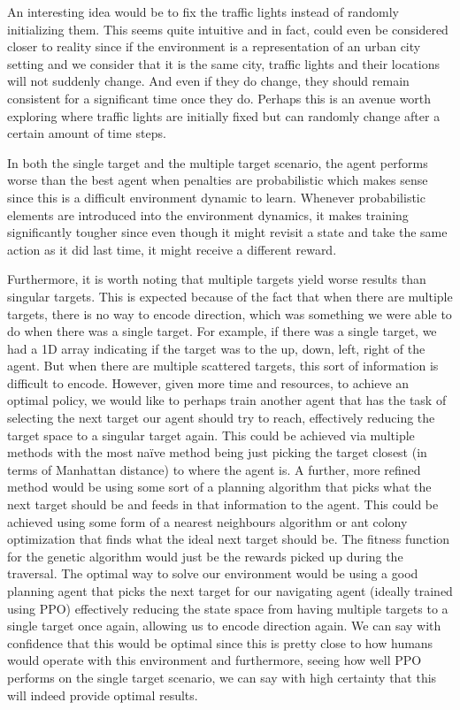 \documentclass{article}
\begin{document}
An interesting idea would be to fix the traffic lights instead of randomly initializing them. This seems quite intuitive and in fact, could even be considered closer to reality since if the environment is a representation of an urban city setting and we consider that it is the same city, traffic lights and their locations will not suddenly change. And even if they do change, they should remain consistent for a significant time once they do. Perhaps this is an avenue worth exploring where traffic lights are initially fixed but can randomly change after a certain amount of time steps. 

In both the single target and the multiple target scenario, the agent performs worse than the best agent when penalties are probabilistic which makes sense since this is a difficult environment dynamic to learn. Whenever probabilistic elements are introduced into the environment dynamics, it makes training significantly tougher since even though it might revisit a state and take the same action as it did last time, it might receive a different reward.

Furthermore, it is worth noting that multiple targets yield worse results than singular targets. This is expected because of the fact that when there are multiple targets, there is no way to encode direction, which was something we were able to do when there was a single target. For example, if there was a single target, we had a 1D array indicating if the target was to the up, down, left, right of the agent. But when there are multiple scattered targets, this sort of information is difficult to encode. However, given more time and resources, to achieve an optimal policy, we would like to perhaps train another agent that has the task of selecting the next target our agent should try to reach, effectively reducing the target space to a singular target again. This could be achieved via multiple methods with the most na\"ive method being just picking the target closest (in terms of Manhattan distance) to where the agent is. A further, more refined method would be using some sort of a planning algorithm that picks what the next target should be and feeds in that information to the agent. This could be achieved using some form of a nearest neighbours algorithm or ant colony optimization that finds what the ideal next target should be. The fitness function for the genetic algorithm would just be the rewards picked up during the traversal. The optimal way to solve our environment would be using a good planning agent that picks the next target for our navigating agent (ideally trained using PPO) effectively reducing the state space from having multiple targets to a single target once again, allowing us to encode direction again. We can say with confidence that this would be optimal since this is pretty close to how humans would operate with this environment and furthermore, seeing how well PPO performs on the single target scenario, we can say with high certainty that this will indeed provide optimal results.
\end{document}
